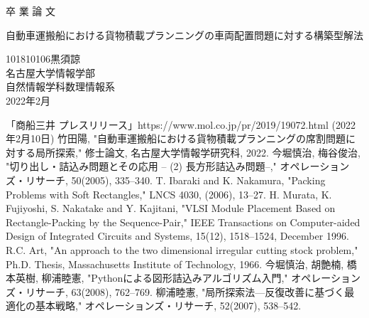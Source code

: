 \documentclass[platex]{jreport}
\begin{document}
\begin{table}[b]
\begin{center}
{\huge 卒\hspace{0.1cm} 業\hspace{0.1cm} 論\hspace{0.1cm} 文}\\[2.5cm]
\begin{spacing}{1.5}
	{\huge 自動車運搬船における貨物積載プランニングの車両配置問題に対する構築型解法}\\[6cm]
\end{spacing}
{\huge 101810106\qquad 黒須諒}\\[1cm]
{\huge 名古屋大学情報学部}\\[0.5cm]
{\huge 自然情報学科数理情報系}\\[0.5cm]
{\huge 2022年2月}\\
\end{center}
\end{table} 


\thispagestyle{empty} 
\clearpage
\newpage
{}
\setcounter{page}{1}



% 



\thispagestyle{empty} 
\tableofcontents
\newpage
\setcounter{page}{1}
\pagestyle{plain}







% 







\begin{thebibliography}{99}
	「商船三井 プレスリリース」https://www.mol.co.jp/pr/2019/19072.html (2022年2月10日)
	竹田陽, "自動車運搬船における貨物積載プランニングの席割問題に対する局所探索," 修士論文, 名古屋大学情報学研究科, 2022.
	今堀慎治, 梅谷俊治, "切り出し・詰込み問題とその応用 -- (2) 長方形詰込み問題--," オペレーションズ・リサーチ, 50(2005), 335--340.
	T. Ibaraki and K. Nakamura, "Packing Problems with Soft Rectangles," LNCS 4030, (2006), 13--27.
	H. Murata, K. Fujiyoshi, S. Nakatake and Y. Kajitani, "VLSI Module Placement Based on Rectangle-Packing by the Sequence-Pair," 
	IEEE Transactions on Computer-aided Design of Integrated Circuits and Systems, 15(12), 1518--1524, December 1996.
	R.C. Art, "An approach to the two dimensional irregular cutting stock problem,"
	Ph.D. Thesis, Massachusetts Institute of Technology, 1966.
	今堀慎治, 胡艶楠, 橋本英樹, 柳浦睦憲, "Pythonによる図形詰込みアルゴリズム入門," 
	オペレーションズ・リサーチ, 63(2008), 762--769.
	柳浦睦憲, "局所探索法—反復改善に基づく最適化の基本戦略," オペレーションズ・リサーチ, 52(2007), 538--542.

\end{thebibliography}
\end{document}
